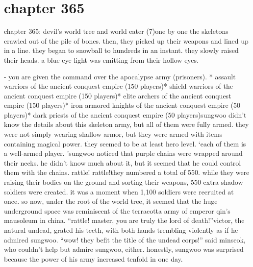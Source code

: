 \section{chapter 365}

chapter 365: devil’s world tree and world eater (7)one by one the skeletons crawled out of the pile of bones.
 then, they picked up their weapons and lined up in a line.
 they began to snowball to hundreds in an instant.
 they slowly raised their heads.
 a blue eye light was emitting from their hollow eyes.





- you are given the command over the apocalypse army (prisoners).
* assault warriors of the ancient conquest empire (150 players)* shield warriors of the ancient conquest empire (150 players)* elite archers of the ancient conquest empire (150 players)* iron armored knights of the ancient conquest empire (50 players)* dark priests of the ancient conquest empire (50 players)sungwoo didn’t know the details about this skeleton army, but all of them were fully armed.
they were not simply wearing shallow armor, but they were armed with items containing magical power.
 they seemed to be at least hero level.
‘each of them is a well-armed player.
’sungwoo noticed that purple chains were wrapped around their necks.
 he didn’t know much about it, but it seemed that he could control them with the chains.
rattle! rattle!they numbered a total of 550.
 while they were raising their bodies on the ground and sorting their weapons, 550 extra shadow soldiers were created.
 it was a moment when 1,100 soldiers were recruited at once.
so now, under the root of the world tree, it seemed that the huge underground space was reminiscent of the terracotta army of emperor qin’s mausoleum in china.
“rattle! master, you are truly the lord of death!”victor, the natural undead, grated his teeth, with both hands trembling violently as if he admired sungwoo.
“wow! they befit the title of the undead corps!” said minseok, who couldn’t help but admire sungwoo, either.
honestly, sungwoo was surprised because the power of his army increased tenfold in one day.

